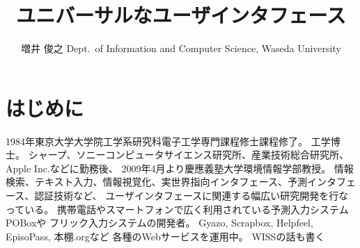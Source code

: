 \documentclass{compsoft}
\begin{document}
\title{ユニバーサルなユーザインタフェース}

%
\author{増井 俊之
%
%
%
%
%
{Dept.\ of Information and Computer Science, Waseda University}
%
\shutten
%
%
}

%
%
%
\maketitle

\section{はじめに}

{1984年東京大学大学院工学系研究科電子工学専門課程修士課程修了。
工学博士。
シャープ、ソニーコンピュータサイエンス研究所、産業技術総合研究所、Apple Inc.などに勤務後、
2009年4月より慶應義塾大学環境情報学部教授。
情報検索、テキスト入力、情報視覚化、実世界指向インタフェース、予測インタフェース、認証技術など、
ユーザインタフェースに関連する幅広い研究開発を行なっている。
携帯電話やスマートフォンで広く利用されている予測入力システムPOBoxや
フリック入力システムの開発者。
Gyazo, Scrapbox, Helpfeel, EpisoPass, 本棚.orgなど
各種のWebサービスを運用中。
WISSの話も書く
}
\end{document}
